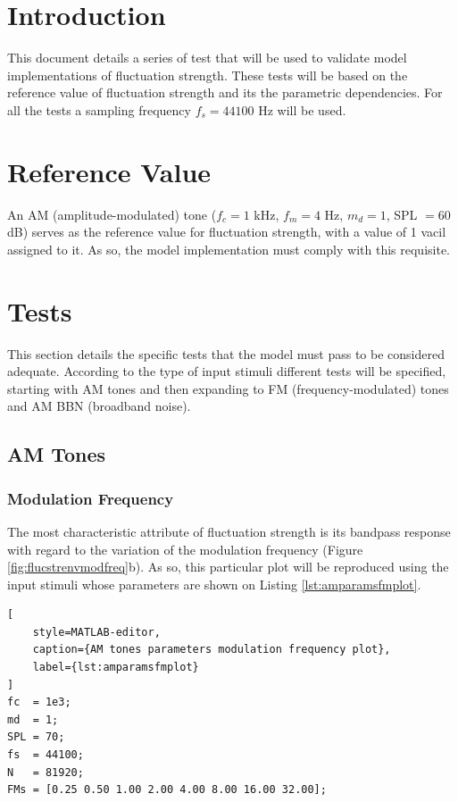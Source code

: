 \documentclass[a4paper]{article}
\begin{document}

\section{Introduction}

This document details a series of test that will be used to validate model
implementations of fluctuation strength. These tests will be based on the
reference value of fluctuation strength and its the parametric dependencies. For
all the tests a sampling frequency $f_s = 44100 $ Hz will be used.

\section{Reference Value}

An AM (amplitude-modulated) tone ($f_c = 1$ kHz, $f_m = 4$ Hz, $m_d = 1$,
SPL $=60$ dB) serves as the reference value for fluctuation strength, with a
value of 1 vacil assigned to it. As so, the model implementation must comply
with this requisite.

\section{Tests}

This section details the specific tests that the model must pass to be
considered adequate. According to the type of input stimuli different tests
will be specified, starting with AM tones and then expanding to FM
(frequency-modulated) tones and AM BBN (broadband noise).

\subsection{AM Tones}

\subsubsection{Modulation Frequency}

The most characteristic attribute of fluctuation strength is its bandpass
response with regard to the variation of the modulation frequency (Figure
\ref{fig:flucstrenvmodfreq}b). As so, this particular plot will be reproduced
using the input stimuli whose parameters are shown on Listing
\ref{lst:amparamsfmplot}.

\begin{lstlisting}[
    style=MATLAB-editor,
    caption={AM tones parameters modulation frequency plot},
    label={lst:amparamsfmplot}
]
fc  = 1e3;
md  = 1;
SPL = 70;
fs  = 44100;
N   = 81920;
FMs = [0.25 0.50 1.00 2.00 4.00 8.00 16.00 32.00];
\end{lstlisting}
\end{document}
